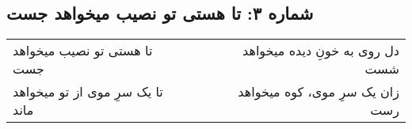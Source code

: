 \begin{center}
\section*{شماره ۳: تا هستی تو نصیب میخواهد جست}
\label{sec:003}
\begin{longtable}{l p{0.5cm} r}
تا هستی تو نصیب میخواهد جست
&&
دل روی به خونِ دیده میخواهد شست
\\
تا یک سرِ موی از تو میخواهد ماند
&&
زان یک سرِ موی، کوه میخواهد رست
\\
\end{longtable}
\end{center}
